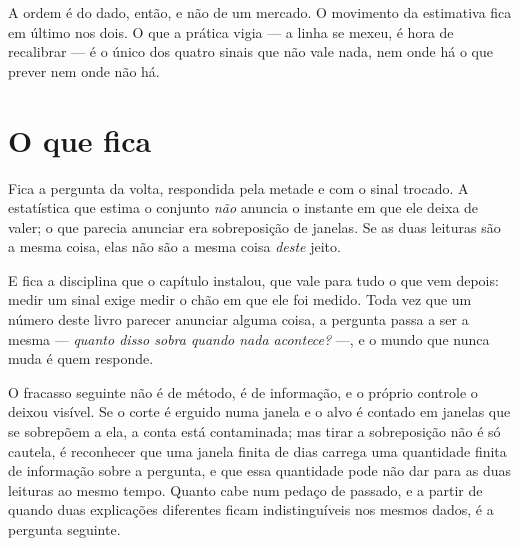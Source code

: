 A ordem é do dado, então, e não de um mercado. O movimento da estimativa fica em último nos dois.
O que a prática vigia --- a linha se mexeu, é hora de recalibrar --- é o único dos quatro sinais
que não vale nada, nem onde há o que prever nem onde não há.

\section{O que fica}

Fica a pergunta da volta, respondida pela metade e com o sinal trocado. A estatística que estima
o conjunto \emph{não} anuncia o instante em que ele deixa de valer; o que parecia anunciar era
sobreposição de janelas. Se as duas leituras são a mesma coisa, elas não são a mesma coisa
\emph{deste} jeito.

E fica a disciplina que o capítulo instalou, que vale para tudo o que vem depois: medir um sinal
exige medir o chão em que ele foi medido. Toda vez que um número deste livro parecer anunciar
alguma coisa, a pergunta passa a ser a mesma --- \emph{quanto disso sobra quando nada acontece?}
---, e o mundo que nunca muda é quem responde.

O fracasso seguinte não é de método, é de informação, e o próprio controle o deixou visível. Se
o corte é erguido numa janela e o alvo é contado em janelas que se sobrepõem a ela, a conta está
contaminada; mas tirar a sobreposição não é só cautela, é reconhecer que uma janela finita de
dias carrega uma quantidade finita de informação sobre a pergunta, e que essa quantidade pode
não dar para as duas leituras ao mesmo tempo. Quanto cabe num pedaço de passado, e a partir de
quando duas explicações diferentes ficam indistinguíveis nos mesmos dados, é a pergunta seguinte.
